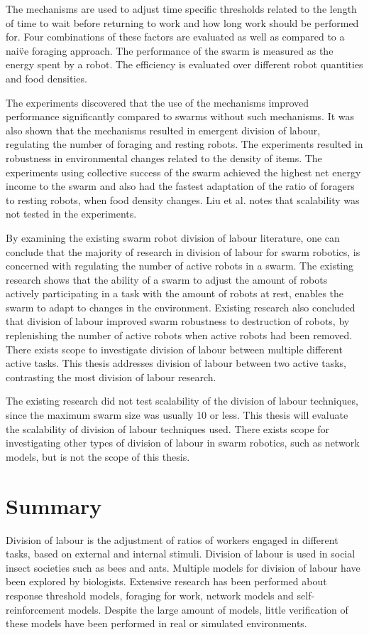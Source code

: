 The mechanisms are used to adjust time specific thresholds related to the length of time to wait before returning to work and how long work should be performed for.
Four combinations of these factors are evaluated as well as compared to a nai\"ve foraging approach. The performance of the swarm is measured as the energy spent by a robot. The efficiency is evaluated over different robot quantities and food densities.

The experiments discovered that the use of the mechanisms improved performance significantly compared to swarms without such mechanisms. It was also shown that the mechanisms resulted in emergent division of labour, regulating the number of foraging and resting robots. The experiments resulted in robustness in environmental changes related to the density of items. The experiments using collective success of the swarm achieved the highest net energy income to the swarm and also had the fastest adaptation of the ratio of foragers to resting robots, when food density changes. Liu et al. \cite{liu2007towards} notes that scalability was not tested in the experiments.

By examining the existing swarm robot division of labour literature, one can conclude that the majority of research in division of labour for swarm robotics, is concerned with regulating the number of active robots in a swarm. The existing research shows that the ability of a swarm to adjust the amount of robots actively participating in a task with the amount of robots at rest, enables the swarm to adapt to changes in the environment. Existing research also concluded that division of labour improved swarm robustness to destruction of robots, by replenishing the number of active robots when active robots had been removed. There exists scope to investigate division of labour between multiple different active tasks. This thesis addresses division of labour between two active tasks, contrasting the most division of labour research.

The existing research did not test scalability of the division of labour techniques, since the maximum swarm size was usually 10 or less. This thesis will evaluate the scalability of division of labour techniques used. There exists scope for investigating other types of division of labour in swarm robotics, such as network models, but is not the scope of this thesis.


\section{Summary}
\label{sec:second:summary}
Division of labour is the adjustment of ratios of workers engaged in different tasks, based on external and internal stimuli. Division of labour is used in social insect societies such as bees and ants. Multiple models for division of labour have been explored by biologists. Extensive research has been performed about response threshold models, foraging for work, network models and self-reinforcement models. Despite the large amount of models, little verification of these models have been performed in real or simulated environments. 

